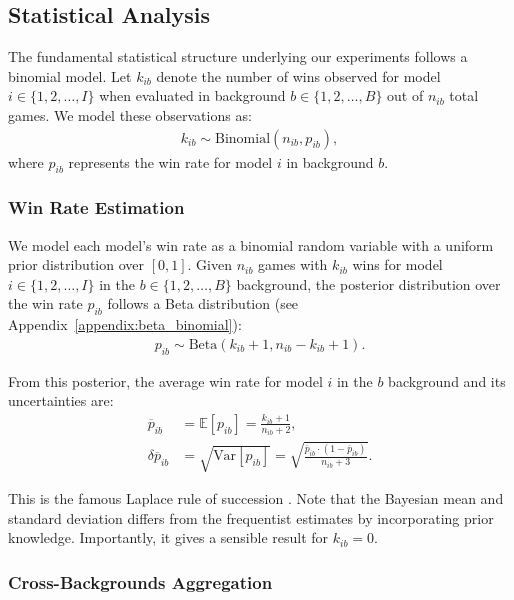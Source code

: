 \documentclass[sigconf]{aamas}
\begin{document}
\subsection{Statistical Analysis}

The fundamental statistical structure underlying our experiments follows a binomial model. Let $k_{ib}$ denote the number of wins observed for model $i\in\{1,2,\dots,I\}$ when evaluated in background $b\in\{1,2,\dots,B\}$ out of $n_{ib}$ total games. We model these observations as:
\begin{align}
    k_{ib} \sim \text{Binomial}(n_{ib}, p_{ib}),
\end{align}
where $p_{ib}$ represents the win rate for model $i$ in background $b$.

\subsubsection{Win Rate Estimation}
\label{sec:win_rate_estimation}

We model each model's win rate as a binomial random variable with a uniform prior distribution over $[0,1]$. Given $n_{ib}$ games with $k_{ib}$ wins for model $i\in\{1,2,\dots,I\}$ in the $b\in\{1,2,\dots,B\}$ background, the posterior distribution over the win rate $p_{ib}$ follows a Beta distribution (see Appendix~\ref{appendix:beta_binomial}):
\begin{align}
p_{ib}\sim \text{Beta}(k_{ib} + 1, n_{ib} - k_{ib} + 1).
\end{align}

From this posterior, the average win rate for model $i$ in the $b$ background and its uncertainties are:
\begin{align}
\overline{p}_{ib} & = \mathbb{E}[p_{ib}] = \frac{k_{ib} + 1}{n_{ib} + 2} \label{eq:binomial_background},\\
\delta\overline{p}_{ib} & =\sqrt{\textrm{Var}[p_{ib}]} = \sqrt{\frac{\overline{p}_{ib} \cdot (1 - \overline{p}_{ib})}{n_{ib} + 3}}.
\label{uncertainty}
\end{align}

This is the famous Laplace rule of succession \cite{Laplace1812}. Note that the Bayesian mean and standard deviation differs from the frequentist estimates by incorporating prior knowledge. Importantly, it gives a sensible result for $k_{ib}=0$.


\subsubsection{Cross-Backgrounds Aggregation}
\label{sec:aggregating_accross_backgrounds}
\end{document}
